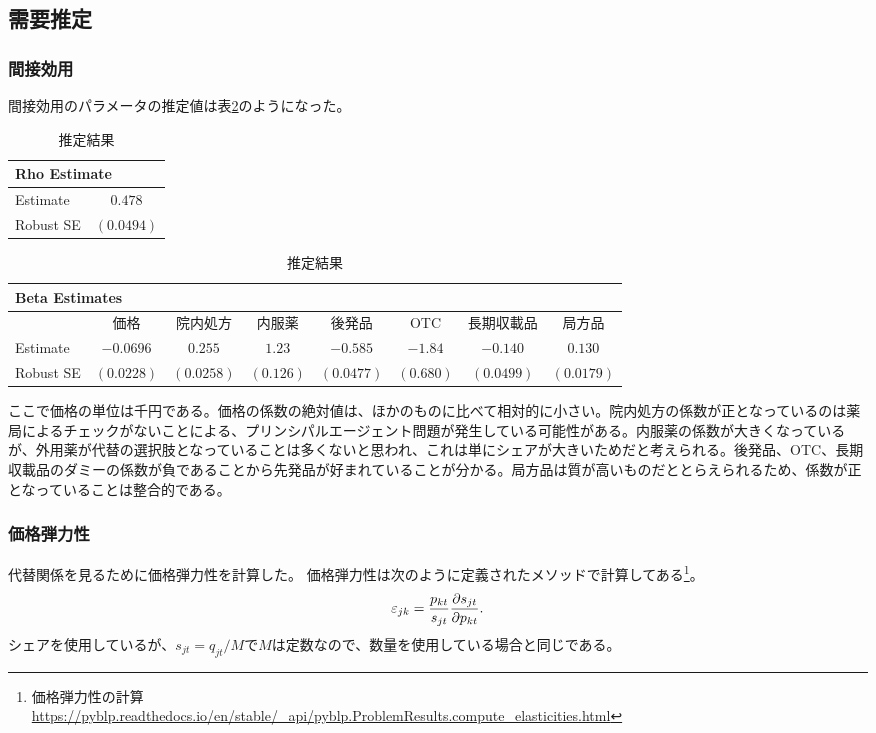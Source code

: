 \documentclass[a4paper,11pt,uplatex]{jsarticle}
\theoremstyle{definition}
\begin{document}
\subsection{需要推定}
\subsubsection{間接効用}
間接効用のパラメータの推定値は表\ref{indirect_utility}のようになった。
\begin{table}[H]
    \centering
    \footnotesize
    \caption{推定結果}\label{indirect_utility}
    \begin{tabular}{l c}
        \toprule
        \multicolumn{2}{l}{Rho Estimate} \\
        \midrule
        Estimate & $0.478$\\
        Robust SE & $(0.0494)$ \\
        \bottomrule
    \end{tabular}

    \vspace{1em}
    \footnotesize
    \begin{tabular}{lccccccc}
        \toprule
        \multicolumn{8}{l}{Beta Estimates} \\
        \midrule
        & 価格 & 院内処方 & 内服薬 & 後発品 & OTC & 長期収載品 & 局方品 \\
        \midrule
        Estimate & $-0.0696$ & $0.255$ & $1.23$ & $-0.585 $ & $-1.84 $ & $-0.140 $ & $0.130 $ \\
        Robust SE & $(0.0228 )$ & $(0.0258 )$ & $(0.126 )$ & $(0.0477)$ & $(0.680)$ & $(0.0499 )$ & $(0.0179 )$ \\
        \bottomrule
    \end{tabular}
\end{table}
ここで価格の単位は千円である。価格の係数の絶対値は、ほかのものに比べて相対的に小さい。院内処方の係数が正となっているのは薬局によるチェックがないことによる、プリンシパルエージェント問題が発生している可能性がある。内服薬の係数が大きくなっているが、外用薬が代替の選択肢となっていることは多くないと思われ、これは単にシェアが大きいためだと考えられる。後発品、OTC、長期収載品のダミーの係数が負であることから先発品が好まれていることが分かる。局方品は質が高いものだととらえられるため、係数が正となっていることは整合的である。
\subsubsection{価格弾力性}
代替関係を見るために価格弾力性を計算した。
価格弾力性は次のように定義されたメソッドで計算してある\footnote{価格弾力性の計算\\\url{https://pyblp.readthedocs.io/en/stable/_api/pyblp.ProblemResults.compute_elasticities.html}}。
\begin{align*}
\varepsilon_{jk}=\frac{p_{kt}}{s_{jt}} \pdv{s_{jt}}{p_{kt}}.
\end{align*}
シェアを使用しているが、\(s_{jt}=q_{jt}/M\)で\(M\)は定数なので、数量を使用している場合と同じである。
\end{document}
